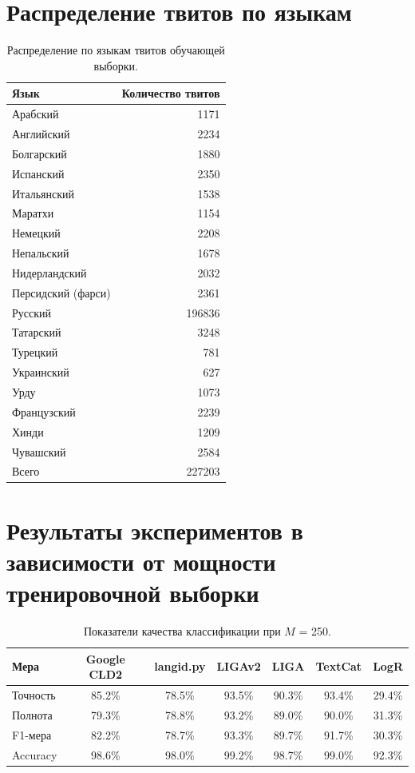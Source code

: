 \documentclass[a4paper, 14pt]{article}
\begin{document}
\section{Распределение твитов по языкам}
				\begin{center}
			\begin{table}[h]
			\begin{tabular*}{\textwidth}{|@{\extracolsep{\fill} }l  r|}
				\hline
				Язык  & Количество твитов \\
				\hline
				Арабский & 1171 \\
				Английский & 2234 \\
				Болгарский & 1880 \\
				Испанский & 2350 \\
				Итальянский & 1538 \\
				Маратхи & 1154 \\
				Немецкий & 2208 \\
				Непальский & 1678 \\
				Нидерландский & 2032 \\
				Персидский (фарси) & 2361 \\
				Русский & 196836 \\
				Татарский & 3248 \\
				Турецкий & 781 \\
				Украинский & 627 \\
				Урду & 1073 \\
				Французский & 2239 \\
				Хинди & 1209 \\
				Чувашский & 2584 \\
				\hline
				Всего & 227203 \\
				\hline
			\end{tabular*}
			\caption{Распределение по языкам твитов обучающей выборки.}
			\end{table}
			\end{center}	
\pagebreak
\section{Результаты экспериментов в зависимости от мощности тренировочной выборки}
\begin{center}
\begin{table}[h]
\begin{tabular*}{0.954\textwidth}{| l| *{6}{|c} |}
\hline 
Мера & Google CLD2 & langid.py & LIGAv2 & LIGA & TextCat  & LogR\\
\hline
Точность & 85.2\% & 78.5\% & 93.5\% & 90.3\% & 93.4\% & 29.4\%\\
Полнота & 79.3\% & 78.8\% & 93.2\% & 89.0\% & 90.0\% & 31.3\%\\
F1-мера & 82.2\% & 78.7\% & 93.3\% & 89.7\% & 91.7\% & 30.3\%\\
Accuracy & 98.6\% & 98.0\% & 99.2\% & 98.7\% & 99.0\% & 92.3\%\\
\hline
\end{tabular*}
\caption{Показатели качества классификации при $M$ = 250.}
\end{table}
\end{center}
\end{document}
